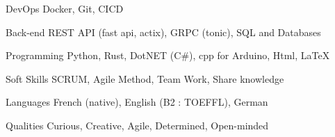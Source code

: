 

\begin{cvskills}

  \cvskill
    {DevOps} %
    {Docker, Git, CICD} %

  \cvskill
    {Back-end} %
    {REST API (fast api, actix), GRPC (tonic), SQL and Databases} %

  \cvskill
    {Programming} %
    {Python, Rust, DotNET (C\#), cpp for Arduino, Html, LaTeX} %

  \cvskill
    {Soft Skills} %
    {SCRUM, Agile Method, Team Work, Share knowledge} %

  \cvskill
    {Languages} %
    {French (native), English (B2 : TOEFFL), German} %

  \cvskill
    {Qualities} %
    {Curious, Creative, Agile, Determined, Open-minded} %

\end{cvskills}

